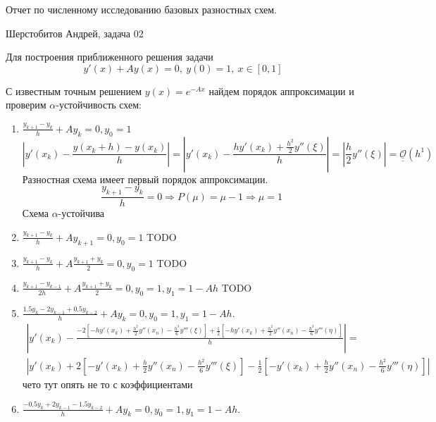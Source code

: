 \documentclass[12pt]{article}
\def\bigO{ \underline{\underline{\mathcal{O}}} }
\begin{document}
\begin{center}
Отчет по численному исследованию базовых разностных схем.
\end{center}
\begin{center}
Шерстобитов Андрей, задача 02
\end{center}

Для построения приближенного решения задачи
\[
    y'(x) + Ay(x) = 0,\ y(0) = 1,\ x \in [0, 1]
\]

С известным точным решением $y(x) = e^{-Ax}$ найдем порядок аппроксимации и проверим $\alpha$-устойчивость схем:
\begin{enumerate}
    \item $\frac{y_{k+1} - y_{k}}{h} + Ay_{k} = 0, y_0 = 1$
    \[\left|y'(x_k)-\frac{y(x_k+h)-y(x_k)}{h}\right|=\left|y'(x_k)-\frac{hy'(x_k)+\frac{h^2}{2}y''(\xi)}{h}\right| = \left|\frac{h}{2}y''(\xi)\right|=\bigO(h^1)\]
    Разностная схема имеет первый порядок аппроксимации.
    \[\frac{y_{k+1}-y_k}{h}=0\Rightarrow P(\mu)=\mu-1\Rightarrow \mu=1\]
    Схема $\alpha$-устойчива
    \item $\frac{y_{k+1} - y_{k}}{h} + Ay_{k+1} = 0, y_0 = 1$
    TODO
    \item $\frac{y_{k+1} - y_{k}}{h} + A\frac{y_{k+1} + y_{k}}{2} = 0, y_0 = 1$
    TODO
    \item $\frac{y_{k+1} - y_{k-1}}{2h} + A\frac{y_{k+1} + y_{k}}{2} = 0, y_0 = 1, y_1 = 1 - Ah$
    TODO
    \item $\frac{1.5y_{k} - 2y_{k-1} + 0.5y_{k-2}}{h} + Ay_k = 0, y_0 = 1, y_1 = 1 - Ah.$
    \begin{multline*}
        \left|y'(x_k)-\frac{-2[-hy'(x_k)+\frac{h^2}{2}y''(x_n)-\frac{h^3}{6}y'''(\xi)]+\frac{1}{2}[-hy'(x_k)+\frac{h^2}{2}y''(x_n)-\frac{h^3}{6}y'''(\eta)]}{h}\right|=\\
        \left|y'(x_k)+2[-y'(x_k)+\frac{h}{2}y''(x_n)-\frac{h^2}{6}y'''(\xi)]-\frac{1}{2}[-y'(x_k)+\frac{h}{2}y''(x_n)-\frac{h^2}{6}y'''(\eta)]\right|
    \end{multline*}
    чето тут опять не то с коэффициентами
    \item $\frac{-0.5y_{k} + 2y_{k-1} - 1.5y_{k-2}}{h} + Ay_k = 0, y_0 = 1, y_1 = 1 - Ah.$
\end{enumerate}
\end{document}
